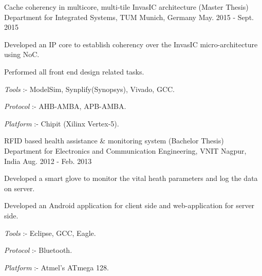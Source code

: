 \begin{cventries}
  \cventry
    {Cache coherency in multicore, multi-tile InvasIC architecture (Master Thesis)} %
    {Department for Integrated Systems, TUM} %
    {Munich, Germany} %
    {May. 2015 - Sept. 2015} %
    {
      \begin{cvitems} %
        \item {Developed an IP core to establish coherency over the InvasIC micro-architecture using NoC.}
        \item {Performed all front end design related tasks.}
        \item {\textit{Tools} :- ModelSim, Synplify(Synopsys), Vivado, GCC.}
        \item {\textit{Protocol} :- AHB-AMBA, APB-AMBA.}
        \item {\textit{Platform} :- Chipit (Xilinx Vertex-5).}
      \end{cvitems}
    } 
      \cventry
    {RFID based health assistance \& monitoring system (Bachelor Thesis)} %
    {Department for Electronics and Communication Engineering, VNIT} %
    {Nagpur, India} %
    {Aug. 2012 - Feb. 2013} %
    {
      \begin{cvitems} %
        \item {Developed a smart glove to monitor the vital heath parameters and log the data on server.}
        \item {Developed an Android application for client side and web-application for server side.}
        \item {\textit{Tools} :- Eclipse, GCC, Eagle.}
        \item {\textit{Protocol} :- Bluetooth.}
        \item {\textit{Platform} :- Atmel's ATmega 128.}
      \end{cvitems}
    }    
\end{cventries}
    

